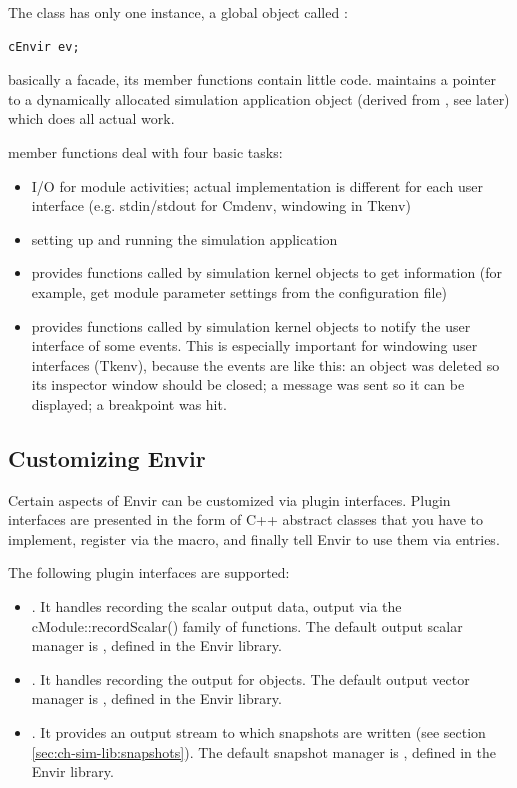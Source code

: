The  class has only one instance, a global object
called :

\begin{verbatim}
cEnvir ev;
\end{verbatim}

 basically a facade, its member functions
contain little code.  maintains a pointer to a
dynamically allocated simulation application object (derived from
, see later) which does all actual work.


 member functions deal with four basic tasks:
\begin{itemize}
  \item{I/O for module activities; actual implementation is different
    for each user interface (e.g. stdin/stdout for Cmdenv, windowing
    in Tkenv)}
  \item{setting up and running the simulation application}
  \item{provides functions called by simulation kernel objects to
    get information (for example, get module parameter settings
    from the configuration file)}
  \item{provides functions called by simulation kernel objects to
    notify the user interface of some events. This is especially
    important for windowing user interfaces (Tkenv), because the
    events are like this: an object was deleted so its inspector
    window should be closed; a message was sent so it can be
    displayed; a breakpoint was hit.}
\end{itemize}


\subsection{Customizing Envir}
\label{sec:ch-opp-design:customization}

Certain aspects of Envir can be customized via plugin interfaces.
Plugin interfaces are presented in the form of C++ abstract classes
that you have to implement, register via the 
macro, and finally tell Envir to use them via  entries.

The following plugin interfaces are supported:

\begin{itemize}
   \item{. It handles recording the scalar output data,
     output via the cModule::recordScalar() family of functions.
     The default output scalar manager is ,
     defined in the Envir library.}
   \item{. It handles recording the output
     for  objects.
     The default output vector manager is ,
     defined in the Envir library.}
   \item{. It provides an output stream to which
     snapshots are written (see section \ref{sec:ch-sim-lib:snapshots}).
     The default snapshot manager is ,
     defined in the Envir library.}
\end{itemize}

